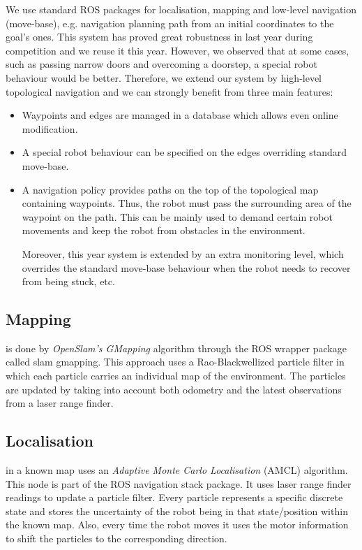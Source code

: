We use standard ROS packages for localisation, mapping and low-level navigation (move-base), e.g. navigation planning path from an initial coordinates to the goal's ones. 
This system has proved great robustness in last year during competition and we reuse it this year. However, we observed that at some cases, such as passing narrow doors and overcoming a doorstep, a special robot behaviour would be better. 
Therefore, we extend our system by high-level topological navigation \cite{jaime} and we can strongly benefit from three main features:
\begin{itemize}
\item Waypoints and edges are managed in a database which allows even online modification.  
\item A special robot behaviour can be specified on the edges overriding standard move-base.
\item A navigation policy \cite{bruno} provides paths on the top of the topological map containing waypoints. 
 Thus, the robot must pass the surrounding area of the waypoint on the path. This can be mainly used to demand certain robot movements and keep the robot from obstacles in the environment.
 
Moreover, this year system is extended by an extra monitoring level, which overrides the standard move-base behaviour when the robot needs to recover from being stuck, etc. 

\end{itemize}

\subsection{Mapping} is done by \textit{OpenSlam's GMapping} algorithm \cite{slam} through the ROS wrapper package called \textsf{slam gmapping}. This approach uses a Rao-Blackwellized particle filter in which each particle carries an individual map of the environment. The particles are updated by taking into account both odometry and the latest observations from a laser range finder.

\subsection{Localisation} in a known map uses an \textit{Adaptive Monte Carlo Localisation} (AMCL)\cite{amcl} algorithm. This node is part of the ROS \textsf{navigation stack} package. It uses laser range finder readings to update a particle filter. Every particle represents a specific discrete state and stores the uncertainty of the robot being in that state/position within the known map. Also, every time the robot moves it uses the motor information to shift the particles to the corresponding direction.

